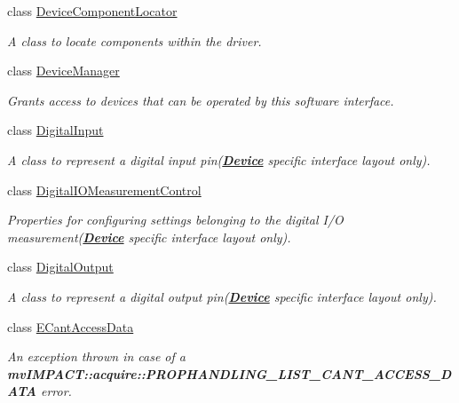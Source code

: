 \begin{DoxyCompactItemize}
class \hyperlink{classmv_i_m_p_a_c_t_1_1acquire_1_1_device_component_locator}{Device\+Component\+Locator}
\begin{DoxyCompactList}\small\item\em A class to locate components within the driver. \end{DoxyCompactList}\item 
class \hyperlink{classmv_i_m_p_a_c_t_1_1acquire_1_1_device_manager}{Device\+Manager}
\begin{DoxyCompactList}\small\item\em Grants access to devices that can be operated by this software interface. \end{DoxyCompactList}\item 
class \hyperlink{classmv_i_m_p_a_c_t_1_1acquire_1_1_digital_input}{Digital\+Input}
\begin{DoxyCompactList}\small\item\em A class to represent a digital input pin({\bfseries \hyperlink{classmv_i_m_p_a_c_t_1_1acquire_1_1_device}{Device}} specific interface layout only). \end{DoxyCompactList}\item 
class \hyperlink{classmv_i_m_p_a_c_t_1_1acquire_1_1_digital_i_o_measurement_control}{Digital\+I\+O\+Measurement\+Control}
\begin{DoxyCompactList}\small\item\em Properties for configuring settings belonging to the digital I/\+O measurement({\bfseries \hyperlink{classmv_i_m_p_a_c_t_1_1acquire_1_1_device}{Device}} specific interface layout only). \end{DoxyCompactList}\item 
class \hyperlink{classmv_i_m_p_a_c_t_1_1acquire_1_1_digital_output}{Digital\+Output}
\begin{DoxyCompactList}\small\item\em A class to represent a digital output pin({\bfseries \hyperlink{classmv_i_m_p_a_c_t_1_1acquire_1_1_device}{Device}} specific interface layout only). \end{DoxyCompactList}\item 
class \hyperlink{classmv_i_m_p_a_c_t_1_1acquire_1_1_e_cant_access_data}{E\+Cant\+Access\+Data}
\begin{DoxyCompactList}\small\item\em An exception thrown in case of a {\bfseries mv\+I\+M\+P\+A\+C\+T\+::acquire\+::\+P\+R\+O\+P\+H\+A\+N\+D\+L\+I\+N\+G\+\_\+\+L\+I\+S\+T\+\_\+\+C\+A\+N\+T\+\_\+\+A\+C\+C\+E\+S\+S\+\_\+\+D\+A\+T\+A} error. \end{DoxyCompactList}\item 

\end{DoxyCompactItemize}
